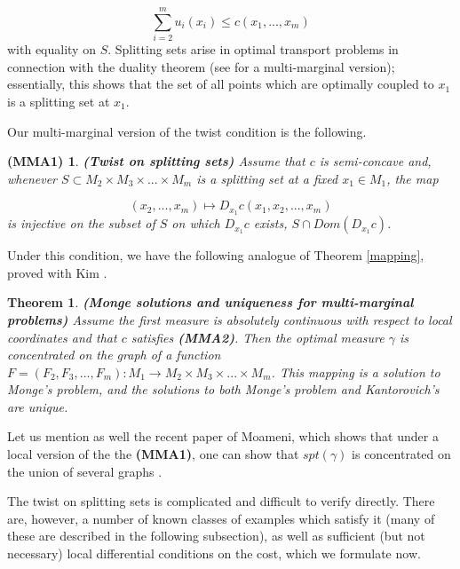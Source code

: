 \documentclass[letter,10pt]{article}
\theoremstyle{dotless}
\begin{document}
\begin{equation*}
\sum_{i=2}^m u_i(x_i) \leq c(x_1,...,x_m) 
\end{equation*}
with equality on $S$.
Splitting sets arise in optimal transport problems in connection with the duality theorem (see \cite{K} for a multi-marginal version); essentially, this shows that the set of all points which are optimally coupled to $x_1$ is a splitting set at $x_1$.  

Our multi-marginal version of the twist condition is the following.
\newtheorem*{twistss}{(MMA1)}
\begin{twistss}
\textbf{(Twist on splitting sets)}
Assume that $c$ is semi-concave and, whenever $S \subset M_2 \times M_3 \times ...\times M_m$ is a splitting set at a fixed $x_1 \in M_1$, the map

\begin{equation}
(x_2,...,x_m) \mapsto D_{x_1}c(x_1,x_2,...,x_m)
\end{equation}
is injective on the subset of $S$ on which $ D_{x_1}c$ exists, $S \cap Dom( D_{x_1}c)$.
\end{twistss}

Under this condition, we have the following analogue of Theorem \ref{mapping}, proved with Kim \cite{KP}.

\newtheorem{mmmapping}[mapping]{Theorem}
\begin{mmmapping}\label{mmmapping}
\textbf{(Monge solutions and uniqueness for multi-marginal problems)} Assume the first measure is absolutely continuous with respect to local coordinates and that $c$ satisfies \textbf{(MMA2)}.  Then the optimal measure $\gamma$ is concentrated on the graph of a function $F =(F_2,F_3,...,F_m): M_1 \rightarrow M_2 \times M_3 \times ...\times M_m$.  This mapping is a solution to Monge's problem, and the solutions to both Monge's problem and Kantorovich's are unique.
\end{mmmapping}
Let us mention as well the recent paper of Moameni, which shows that under a local version of the the \textbf{(MMA1)}, one can show that $spt(\gamma)$ is concentrated on  the union of several graphs \cite{moameni2}.

The twist on splitting sets is complicated and difficult to verify directly.  There are, however, a number of known classes of examples which satisfy it (many of these are described in the following subsection), as well as sufficient (but not necessary) local differential conditions on the cost, which we formulate now.  %
\end{document}
